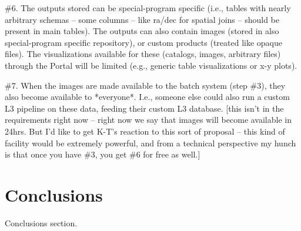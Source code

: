 \documentclass[DM,lsstdraft,toc]{lsstdoc}
\begin{document}
\#6. The outputs stored can be special-program specific (i.e., tables with nearly arbitrary schemas -- some columns -- like ra/dec for spatial joins -- should be present in main tables). The outputs can also contain images (stored in also special-program specific repository), or custom products (treated like opaque files). The visualizations available for these (catalogs, images, arbitrary files) through the Portal will be limited (e.g., generic table visualizations or x-y plots).

\#7. When the images are made available to the batch system (step \#3), they also become available to *everyone*. I.e., someone else could also run a custom L3 pipeline on these data, feeding their custom L3 database. [this isn't in the requirements right now -- right now we say that images will become available in 24hrs. But I'd like to get K-T's reaction to this sort of proposal -- this kind of facility would be extremely powerful, and from a technical perspective my hunch is that once you have \#3, you get \#6 for free as well.]



\section{Conclusions}\label{sec:conc}

Conclusions section.

%


\end{document}
